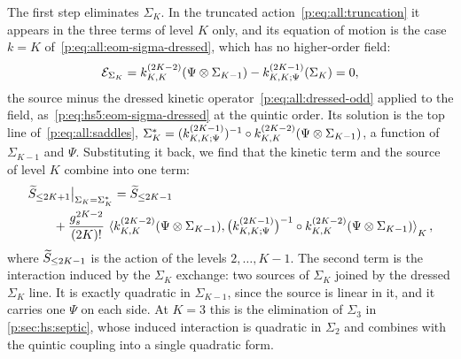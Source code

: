 The first step eliminates $\Sigma_K$.
In the truncated action~\eqref{p:eq:all:truncation} it appears in the three terms of level $K$ only, and its equation of motion is the case $k = K$ of~\eqref{p:eq:all:eom-sigma-dressed}, which has no higher-order field:
\begin{equation}
\label{p:eq:all:eom-top}
\mathcal E_{\Sigma_K}
  = \kin{K}{}{2 K - 2}(\Psi \otimes \Sigma_{K - 1}) - \kin{K}{\Psi}{2 K - 1}(\Sigma_K)
  = 0,
\end{equation}
the source minus the dressed kinetic operator~\eqref{p:eq:all:dressed-odd} applied to the field, as~\eqref{p:eq:hs5:eom-sigma-dressed} at the quintic order.
Its solution is the top line of~\eqref{p:eq:all:saddles}, $\Sigma_K^* = (\kin{K}{\Psi}{2 K - 1})^{-1} \circ \kin{K}{}{2 K - 2}(\Psi \otimes \Sigma_{K - 1})$, a function of $\Sigma_{K - 1}$ and $\Psi$.
Substituting it back, we find that the kinetic term and the source of level $K$ combine into one term:
\begin{equation}
  \label{p:eq:all:eliminate-top}
  \begin{aligned}
    &
    \caction[\le 2 K + 1] \big|_{\Sigma_K = \Sigma_K^*}
      = \caction[\le 2 K - 1]
    \\ &
    \qquad
    + \frac{\gs^{2 K - 2}}{(2 K)!} \, \pair[K]{\kin{K}{}{2 K - 2}(\Psi \otimes \Sigma_{K - 1})}{\big( \kin{K}{\Psi}{2 K - 1} \big)^{-1} \circ \kin{K}{}{2 K - 2}(\Psi \otimes \Sigma_{K - 1})},
  \end{aligned}
\end{equation}
where $\caction[\le 2 K - 1]$ is the action of the levels $2, \ldots, K - 1$.
The second term is the interaction induced by the $\Sigma_K$ exchange: two sources of $\Sigma_K$ joined by the dressed $\Sigma_K$ line.
It is exactly quadratic in $\Sigma_{K - 1}$, since the source is linear in it, and it carries one $\Psi$ on each side.
At $K = 3$ this is the elimination of $\Sigma_3$ in \cref{p:sec:hs:septic}, whose induced interaction is quadratic in $\Sigma_2$ and combines with the quintic coupling into a single quadratic form.

